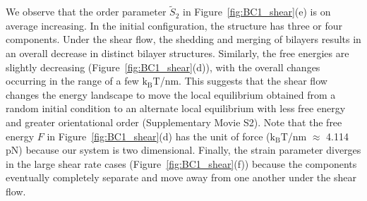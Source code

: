 \documentclass[prb,preprint,showpacs,preprintnumbers,amsmath,amssymb,longbibliography]{revtex4-1}
\begin{document}
We observe that the order parameter $\tilde S_2$ in
Figure~\ref{fig:BC1_shear}(e) is on average increasing. In the initial
configuration, the structure has three or four components.
%
Under the shear flow, the shedding and merging of bilayers results in an
overall decrease in distinct bilayer structures. Similarly, the free
energies are slightly decreasing (Figure~\ref{fig:BC1_shear}(d)), with
the overall changes occurring in the range of a few $\mathrm{k_BT}$/nm.
This suggests that the shear flow changes the energy landscape to move
the local equilibrium obtained from a random initial condition to an
alternate local equilibrium with less free energy and greater
orientational order  (Supplementary Movie S2).  Note that the free energy $F$ in
Figure~\ref{fig:BC1_shear}(d) has the unit of force ($\mathrm{k_BT}$/nm $\approx$ 4.114 pN)
because our system
is two dimensional.
%
%
Finally, the strain parameter diverges in the large shear rate cases
(Figure~\ref{fig:BC1_shear}(f))
because the components eventually completely separate and move away from one another
under the shear flow.
\end{document}
